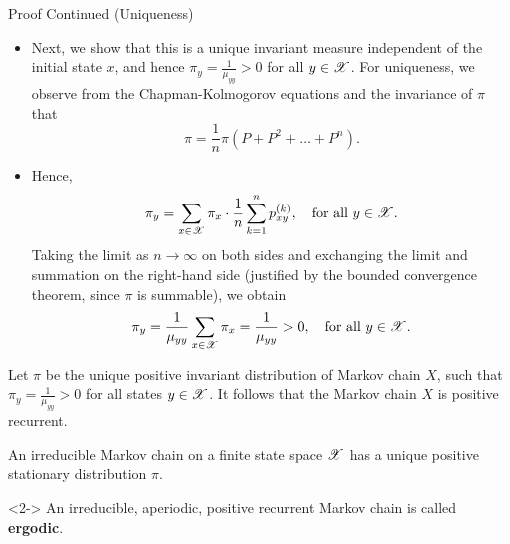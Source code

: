 \documentclass[12pt,aspectratio=169]{beamer}
\begin{document}
\begin{frame}
\begin{block}{Proof Continued (Uniqueness)}
\begin{itemize}
    \item Next, we show that this is a unique invariant measure independent of the initial state $x$, 
    and hence $\pi_y = \frac{1}{\mu_{yy}} > 0$ for all $y \in \mathscr{X}$.  
    For uniqueness, we observe from the Chapman-Kolmogorov equations and the invariance of $\pi$ that
    \[
    \pi = \frac{1}{n} \pi (P + P^2 + \dots + P^n).
    \]
    
    \item<2-> Hence,
    \[
    \pi_y = \sum_{x \in \mathscr{X}} \pi_x \cdot \frac{1}{n} \sum_{k=1}^n p_{xy}^{(k)}, \quad \text{for all } y \in \mathscr{X}.
    \]
    Taking the limit as $n \to \infty$ on both sides and exchanging the limit and summation on the right-hand side (justified by the bounded convergence theorem, since $\pi$ is summable), we obtain
    \[
    \pi_y = \frac{1}{\mu_{yy}} \sum_{x \in \mathscr{X}} \pi_x = \frac{1}{\mu_{yy}} > 0, \quad \text{for all } y \in \mathscr{X}.
    \]
\end{itemize}
\end{block}
\end{frame}

\begin{frame}
\begin{Proof}
Let $\pi$ be the unique positive invariant distribution of Markov chain $X$, such that $\pi_y = \frac{1}{\mu_{yy}} > 0$ for all states $y \in \mathscr{X}$. 
It follows that the Markov chain $X$ is positive recurrent.
\end{Proof}
\end{frame}


\begin{frame}
\begin{cor} 
An irreducible Markov chain on a finite state space $\mathscr{X}$ has a unique positive stationary distribution $\pi$. 
\end{cor}
\begin{Definition}<2->
An irreducible, aperiodic, positive recurrent Markov chain is called \textbf{ergodic}. 
\end{Definition}
\end{frame}
\end{document}
